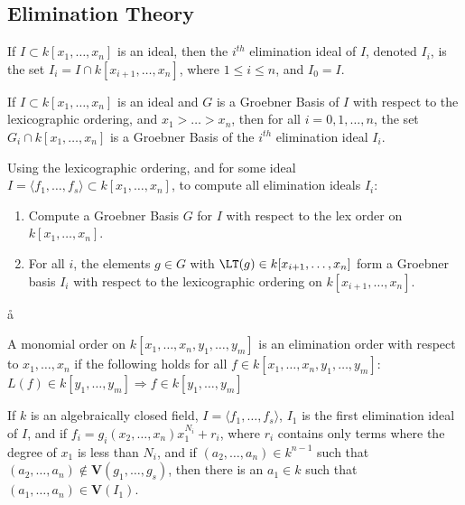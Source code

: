         \subsection{Elimination Theory}
            \begin{definition}
                If $I\subset{k}[x_1,\hdots,x_{n}]$ is an ideal,
                then the $i^{th}$ elimination ideal of $I$,
                denoted $I_{i}$, is the set
                $I_{i}=I\cap{k}[x_{i+1},\hdots,x_{n}]$,
                where $1\leq{i}\leq{n}$, and $I_{0}=I$.
            \end{definition}
            \begin{theorem}
                If $I\subset k[x_1,\hdots ,x_n]$ is an ideal and
                $G$ is a Groebner Basis of $I$ with respect to the
                lexicographic ordering, and $x_1>\hdots > x_n$, then
                for all $i=0,1,\hdots,n$, the set
                $G_{i}\cap{k}[x_1,\hdots,x_n]$ is a Groebner Basis of
                the $i^{th}$ elimination ideal $I_{i}$.
            \end{theorem}
            Using the lexicographic ordering, and for some ideal
            $I=\langle{f_{1}},\hdots,f_{s}\rangle%
               \subset{k}[x_1,\hdots ,x_n]$,
            to compute all elimination ideals $I_{i}$:
            \begin{enumerate}
                \item Compute a Groebner Basis $G$ for $I$ with
                      respect to the lex order on $k[x_1,\hdots,x_n]$.
                \item For all $i$, the elements $g\in G$ with
                      $\LT(g)\in{k}[x_{i+1},\hdots,x_{n}]$ form a
                      Groebner basis $I_{i}$ with respect to
                      the lexicographic ordering on
                      $k[x_{i+1},\hdots,x_n]$.
            \end{enumerate}å
            \begin{definition}
                A monomial order on
                $k[x_{1},\hdots,x_{n},y_{1},\hdots,y_{m}]$
                is an elimination order with respect to
                $x_{1},\hdots,x_{n}$ if the following holds for
                all $f\in{k}[x_{1},\hdots,x_{n},y_{1},\hdots,y_{m}]$:
                $L(f)\in{k}[y_{1},\hdots,y_{m}]%
                 \Rightarrow{f}\in{k}[y_{1},\hdots,y_{m}]$
            \end{definition}
            \begin{theorem}
                If $k$ is an algebraically closed field,
                $I=\langle{f_{1}},\hdots,f_{s}\rangle$, $I_{1}$ is
                the first elimination ideal of $I$, and if
                $f_{i}=g_{i}(x_{2},\hdots,x_{n})x_{1}^{N_i}+r_{i}$,
                where $r_{i}$ contains only terms where the degree
                of $x_{1}$ is less than $N_{i}$, and if
                $(a_{2},\hdots,a_{n})\in{k}^{n-1}$ such that
                $(a_{2},\hdots,a_{n})\notin%
                 \mathbf{V}(g_{1},\hdots,g_{s})$,
                 then there is an $a_1 \in k$ such that
                 $(a_{1},\hdots,a_{n})\in\mathbf{V}(I_1)$.
            \end{theorem}
